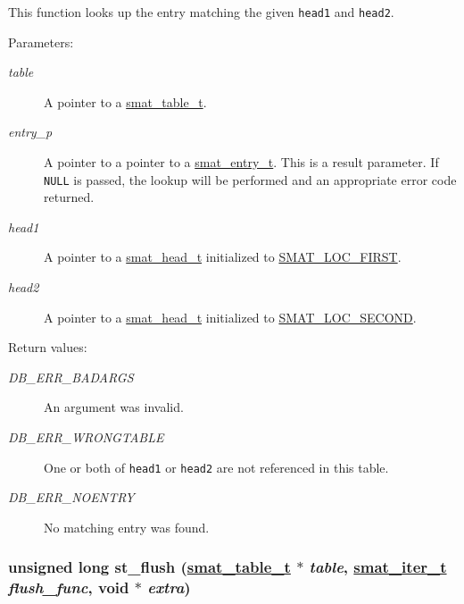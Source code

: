 This function looks up the entry matching the given {\tt head1} and {\tt head2}.\begin{Desc}
\item[Parameters: ]\par
\begin{description}
\item[{\em 
table}]A pointer to a \hyperlink{group__dbprim__smat_a0}{smat\_\-table\_\-t}. \item[{\em 
entry\_\-p}]A pointer to a pointer to a \hyperlink{group__dbprim__smat_a2}{smat\_\-entry\_\-t}. This is a result parameter. If {\tt NULL} is passed, the lookup will be performed and an appropriate error code returned. \item[{\em 
head1}]A pointer to a \hyperlink{group__dbprim__smat_a1}{smat\_\-head\_\-t} initialized to \hyperlink{group__dbprim__smat_a48a136}{SMAT\_\-LOC\_\-FIRST}. \item[{\em 
head2}]A pointer to a \hyperlink{group__dbprim__smat_a1}{smat\_\-head\_\-t} initialized to \hyperlink{group__dbprim__smat_a48a137}{SMAT\_\-LOC\_\-SECOND}.\end{description}
\end{Desc}
\begin{Desc}
\item[Return values: ]\par
\begin{description}
\item[{\em 
DB\_\-ERR\_\-BADARGS}]An argument was invalid. \item[{\em 
DB\_\-ERR\_\-WRONGTABLE}]One or both of {\tt head1} or {\tt head2} are not referenced in this table. \item[{\em 
DB\_\-ERR\_\-NOENTRY}]No matching entry was found. \end{description}
\end{Desc}
\hypertarget{group__dbprim__smat_a14}{
\subsubsection[st\_\-flush]{\setlength{\rightskip}{0pt plus 5cm}unsigned long st\_\-flush (\hyperlink{group__dbprim__smat_a0}{smat\_\-table\_\-t} $\ast$ {\em table}, \hyperlink{group__dbprim__smat_a4}{smat\_\-iter\_\-t} {\em flush\_\-func}, void $\ast$ {\em extra})}}
\label{group__dbprim__smat_a14}


